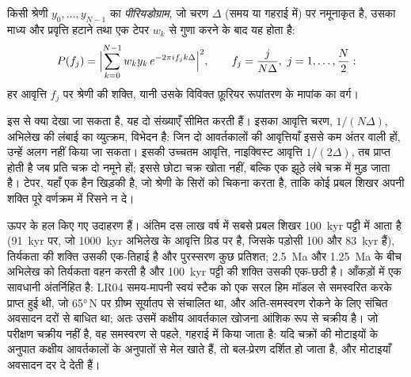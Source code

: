 \begin{omfigure}
\par{}\label{fig:b3:sequence-stratigraphy:periodogram}
\end{omfigure}

\begin{definition}[पीरियडोग्राम]\label{def:b3:sequence-stratigraphy:periodogram}
किसी श्रेणी $y_0, \dots, y_{N-1}$ का \emph{पीरियडोग्राम},
जो चरण $\Delta$ (समय या गहराई में) पर नमूनाकृत है, उसका माध्य और प्रवृत्ति हटाने
तथा एक टेपर $w_k$ से गुणा करने के बाद यह होता है:
\[
P(f_j) = \Bigl|\sum_{k=0}^{N-1} w_k y_k\, e^{-2\pi i f_j k\Delta}\Bigr|^2,
\qquad f_j = \frac{j}{N\Delta},\ j = 1, \dots, \frac N2:
\]
हर आवृत्ति $f_j$ पर श्रेणी की शक्ति, यानी उसके विविक्त फ़ूरियर रूपांतरण के
मापांक का वर्ग।
\end{definition}

इस  से क्या देखा जा सकता है, यह दो संख्याएँ सीमित करती हैं। इसका आवृत्ति चरण, $1/(N\Delta)$,
अभिलेख की लंबाई का व्युत्क्रम, विभेदन है: जिन दो आवर्तकालों की आवृत्तियाँ इससे कम अंतर वाली हों,
उन्हें अलग नहीं किया जा सकता। इसकी उच्चतम आवृत्ति, नाइक्विस्ट आवृत्ति $1/(2\Delta)$, तब प्राप्त होती है
जब प्रति चक्र दो नमूने हों; इससे छोटा चक्र खोता नहीं,
बल्कि एक झूठे लंबे चक्र में मुड़ जाता है। टेपर, यहाँ एक हैन खिड़की है,
जो श्रेणी के सिरों को चिकना करता है, ताकि कोई प्रबल शिखर
अपनी शक्ति पूरे वर्णक्रम में रिसने न दे।


ऊपर के  हल किए गए उदाहरण हैं। अंतिम दस लाख वर्ष में सबसे प्रबल
शिखर \qty{100}{kyr} पट्टी में आता है (\qty{91}{kyr} पर, जो
\qty{1000}{kyr} अभिलेख के आवृत्ति ग्रिड पर है, जिसके पड़ोसी 100 और \qty{83}{kyr} हैं),
तिर्यकता की शक्ति उसकी एक-तिहाई है और पुरस्सरण कुछ प्रतिशत;
\qty{2.5}{Ma} और \qty{1.25}{Ma} के बीच अभिलेख को तिर्यकता वहन करती है और
\qty{100}{kyr} पट्टी की शक्ति उसकी एक-छठी है। आँकड़ों में एक सावधानी अंतर्निहित है: LR04 समय-मापनी
स्वयं स्टैक को एक सरल हिम मॉडल से समस्वरित करके प्राप्त हुई थी,
जो \ang{65}\,N पर ग्रीष्म सूर्यातप से संचालित था, और अति-समस्वरण रोकने के लिए
संचित अवसादन दरों से बाधित था; अतः उसमें कक्षीय आवर्तकाल खोजना आंशिक रूप से चक्रीय है।
जो परीक्षण चक्रीय नहीं है, वह समस्वरण से पहले, गहराई में किया जाता है:
यदि चक्रों की मोटाइयों के अनुपात कक्षीय आवर्तकालों के अनुपातों से मेल खाते हैं,
तो बल-प्रेरण दर्शित हो जाता है,
और मोटाइयाँ अवसादन दर दे देती हैं।

